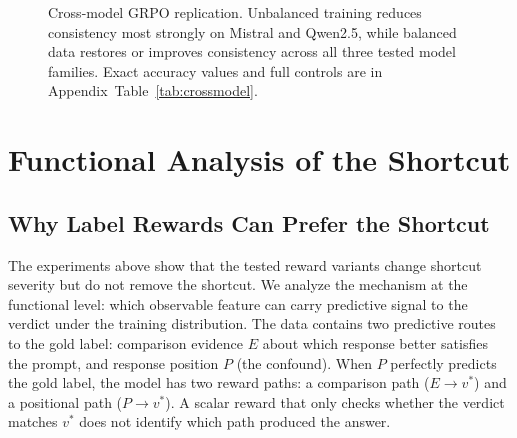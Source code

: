 \documentclass[11pt]{article}
\begin{document}
\begin{figure}[H]
\centering
{}
\caption{Cross-model GRPO replication. Unbalanced training reduces consistency most strongly on Mistral and Qwen2.5, while balanced data restores or improves consistency across all three tested model families. Exact accuracy values and full controls are in \mbox{Appendix Table~\ref{tab:crossmodel}}.}
\label{fig:crossmodel-main}
\end{figure}

\section{Functional Analysis of the Shortcut}

\subsection{Why Label Rewards Can Prefer the Shortcut}

The experiments above show that the tested reward variants change shortcut severity but do not remove the shortcut. We analyze the mechanism at the functional level: which observable feature can carry predictive signal to the verdict under the training distribution. The data contains two predictive routes to the gold label: comparison evidence $E$ about which response better satisfies the prompt, and response position $P$ (the confound). When $P$ perfectly predicts the gold label, the model has two reward paths: a comparison path ($E \to v^*$) and a positional path ($P \to v^*$). A scalar reward that only checks whether the verdict matches $v^*$ does not identify which path produced the answer.
\end{document}
